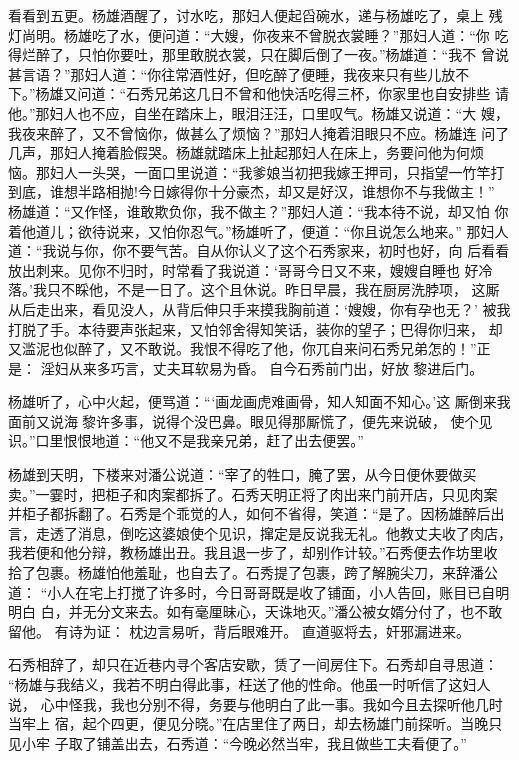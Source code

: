 看看到五更。杨雄酒醒了，讨水吃，那妇人便起舀碗水，递与杨雄吃了，桌上
残灯尚明。杨雄吃了水，便问道：“大嫂，你夜来不曾脱衣裳睡？”那妇人道：“你
吃得烂醉了，只怕你要吐，那里敢脱衣裳，只在脚后倒了一夜。”杨雄道：“我不
曾说甚言语？”那妇人道：“你往常酒性好，但吃醉了便睡，我夜来只有些儿放不
下。”杨雄又问道：“石秀兄弟这几日不曾和他快活吃得三杯，你家里也自安排些
请他。”那妇人也不应，自坐在踏床上，眼泪汪汪，口里叹气。杨雄又说道：“大
嫂，我夜来醉了，又不曾恼你，做甚么了烦恼？”那妇人掩着泪眼只不应。杨雄连
问了几声，那妇人掩着脸假哭。杨雄就踏床上扯起那妇人在床上，务要问他为何烦
恼。那妇人一头哭，一面口里说道：“我爹娘当初把我嫁王押司，只指望一竹竿打
到底，谁想半路相抛!今日嫁得你十分豪杰，却又是好汉，谁想你不与我做主！”
杨雄道：“又作怪，谁敢欺负你，我不做主？”那妇人道：“我本待不说，却又怕
你着他道儿；欲待说来，又怕你忍气。”杨雄听了，便道：“你且说怎么地来。”
那妇人道：“我说与你，你不要气苦。自从你认义了这个石秀家来，初时也好，向
后看看放出刺来。见你不归时，时常看了我说道：‘哥哥今日又不来，嫂嫂自睡也
好冷落。’我只不睬他，不是一日了。这个且休说。昨日早晨，我在厨房洗脖项，
这厮从后走出来，看见没人，从背后伸只手来摸我胸前道：‘嫂嫂，你有孕也无？’
被我打脱了手。本待要声张起来，又怕邻舍得知笑话，装你的望子；巴得你归来，
却又滥泥也似醉了，又不敢说。我恨不得吃了他，你兀自来问石秀兄弟怎的！”正
是：
淫妇从来多巧言，丈夫耳软易为昏。
自今石秀前门出，好放黎进后门。

杨雄听了，心中火起，便骂道：“‘画龙画虎难画骨，知人知面不知心。’这
厮倒来我面前又说海黎许多事，说得个没巴鼻。眼见得那厮慌了，便先来说破，
使个见识。”口里恨恨地道：“他又不是我亲兄弟，赶了出去便罢。”

杨雄到天明，下楼来对潘公说道：“宰了的牲口，腌了罢，从今日便休要做买
卖。”一霎时，把柜子和肉案都拆了。石秀天明正将了肉出来门前开店，只见肉案
并柜子都拆翻了。石秀是个乖觉的人，如何不省得，笑道：“是了。因杨雄醉后出
言，走透了消息，倒吃这婆娘使个见识，撺定是反说我无礼。他教丈夫收了肉店，
我若便和他分辩，教杨雄出丑。我且退一步了，却别作计较。”石秀便去作坊里收
拾了包裹。杨雄怕他羞耻，也自去了。石秀提了包裹，跨了解腕尖刀，来辞潘公道：
“小人在宅上打搅了许多时，今日哥哥既是收了铺面，小人告回，账目已自明明白
白，并无分文来去。如有毫厘昧心，天诛地灭。”潘公被女婿分付了，也不敢留他。
有诗为证：
枕边言易听，背后眼难开。
直道驱将去，奸邪漏进来。

石秀相辞了，却只在近巷内寻个客店安歇，赁了一间房住下。石秀却自寻思道：
“杨雄与我结义，我若不明白得此事，枉送了他的性命。他虽一时听信了这妇人说，
心中怪我，我也分别不得，务要与他明白了此一事。我如今且去探听他几时当牢上
宿，起个四更，便见分晓。”在店里住了两日，却去杨雄门前探听。当晚只见小牢
子取了铺盖出去，石秀道：“今晚必然当牢，我且做些工夫看便了。”

